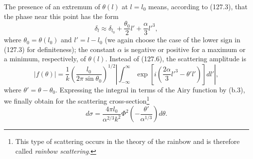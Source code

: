 \SolutionHeading The presence of an extremum of $\theta(l)$ at $l=l_0$
means, according to (127.3), that the phase near this point has the form
\[
 \delta_l\approx\delta_{l_0}+\frac{\theta_0}{2}l'+\frac\alpha3l'^3,
\]
where $\theta_0=\theta(l_0)$ and $l'=l-l_0$ (we again choose the case of the
lower sign in (127.3) for definiteness); the constant $\alpha$ is negative or
positive for a maximum or a minimum, respectively, of $\theta(l)$. Instead of
(127.6), the scattering amplitude is
\[
 |f(\theta)|=\frac1k\left(\frac{l_0}{2\pi\sin\theta_0}\right)^{1/2}
 \left|\int_{-\infty}^{\infty}\exp\left[i\left(\frac{2\alpha}3l'^3-\theta'l'\right)\right]dl'\right|,
\]
where $\theta'=\theta-\theta_0$. Expressing the integral in terms of the Airy
function by (b.3), we finally obtain for the scattering
cross-section\footnote{This type of scattering occurs in the theory of the
rainbow and is therefore called \emph{rainbow scattering}.}
\[
 d\sigma=\frac{4\pi l_0}{\alpha^{2/3}k^2}
 \Phi^2\left(-\frac{\theta'}{\alpha^{1/3}}\right)d\theta.
\]
